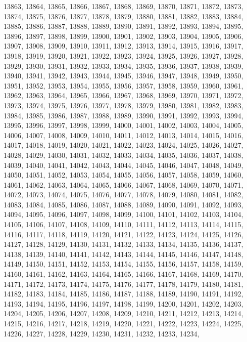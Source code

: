 13863,
13864,
13865,
13866,
13867,
13868,
13869,
13870,
13871,
13872,
13873,
13874,
13875,
13876,
13877,
13878,
13879,
13880,
13881,
13882,
13883,
13884,
13885,
13886,
13887,
13888,
13889,
13890,
13891,
13892,
13893,
13894,
13895,
13896,
13897,
13898,
13899,
13900,
13901,
13902,
13903,
13904,
13905,
13906,
13907,
13908,
13909,
13910,
13911,
13912,
13913,
13914,
13915,
13916,
13917,
13918,
13919,
13920,
13921,
13922,
13923,
13924,
13925,
13926,
13927,
13928,
13929,
13930,
13931,
13932,
13933,
13934,
13935,
13936,
13937,
13938,
13939,
13940,
13941,
13942,
13943,
13944,
13945,
13946,
13947,
13948,
13949,
13950,
13951,
13952,
13953,
13954,
13955,
13956,
13957,
13958,
13959,
13960,
13961,
13962,
13963,
13964,
13965,
13966,
13967,
13968,
13969,
13970,
13971,
13972,
13973,
13974,
13975,
13976,
13977,
13978,
13979,
13980,
13981,
13982,
13983,
13984,
13985,
13986,
13987,
13988,
13989,
13990,
13991,
13992,
13993,
13994,
13995,
13996,
13997,
13998,
13999,
14000,
14001,
14002,
14003,
14004,
14005,
14006,
14007,
14008,
14009,
14010,
14011,
14012,
14013,
14014,
14015,
14016,
14017,
14018,
14019,
14020,
14021,
14022,
14023,
14024,
14025,
14026,
14027,
14028,
14029,
14030,
14031,
14032,
14033,
14034,
14035,
14036,
14037,
14038,
14039,
14040,
14041,
14042,
14043,
14044,
14045,
14046,
14047,
14048,
14049,
14050,
14051,
14052,
14053,
14054,
14055,
14056,
14057,
14058,
14059,
14060,
14061,
14062,
14063,
14064,
14065,
14066,
14067,
14068,
14069,
14070,
14071,
14072,
14073,
14074,
14075,
14076,
14077,
14078,
14079,
14080,
14081,
14082,
14083,
14084,
14085,
14086,
14087,
14088,
14089,
14090,
14091,
14092,
14093,
14094,
14095,
14096,
14097,
14098,
14099,
14100,
14101,
14102,
14103,
14104,
14105,
14106,
14107,
14108,
14109,
14110,
14111,
14112,
14113,
14114,
14115,
14116,
14117,
14118,
14119,
14120,
14121,
14122,
14123,
14124,
14125,
14126,
14127,
14128,
14129,
14130,
14131,
14132,
14133,
14134,
14135,
14136,
14137,
14138,
14139,
14140,
14141,
14142,
14143,
14144,
14145,
14146,
14147,
14148,
14149,
14150,
14151,
14152,
14153,
14154,
14155,
14156,
14157,
14158,
14159,
14160,
14161,
14162,
14163,
14164,
14165,
14166,
14167,
14168,
14169,
14170,
14171,
14172,
14173,
14174,
14175,
14176,
14177,
14178,
14179,
14180,
14181,
14182,
14183,
14184,
14185,
14186,
14187,
14188,
14189,
14190,
14191,
14192,
14193,
14194,
14195,
14196,
14197,
14198,
14199,
14200,
14201,
14202,
14203,
14204,
14205,
14206,
14207,
14208,
14209,
14210,
14211,
14212,
14213,
14214,
14215,
14216,
14217,
14218,
14219,
14220,
14221,
14222,
14223,
14224,
14225,
14226,
14227,
14228,
14229,
14230,
14231,
14232,
14233,
14234,
